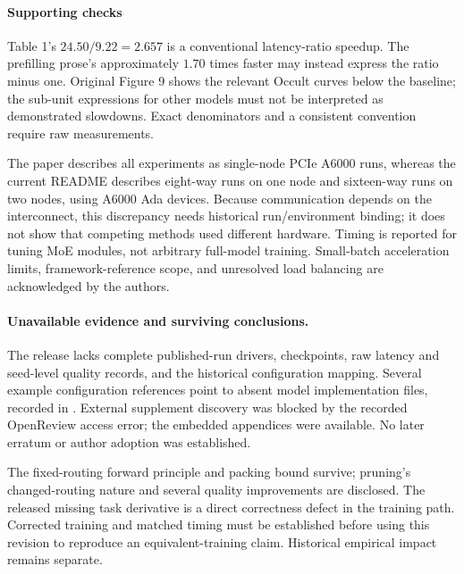 \documentclass[10pt]{article}
\begin{document}
\paragraph*{Supporting checks}\mbox{}\par
Table 1’s \(24.50/9.22=2.657\) is a conventional latency-ratio speedup. The prefilling prose’s approximately \(1.70\) times faster may instead express the ratio minus one. Original Figure 9 shows the relevant Occult curves below the baseline; the sub-unit expressions for other models must not be interpreted as demonstrated slowdowns. Exact denominators and a consistent convention require raw measurements.\par
The paper describes all experiments as single-node PCIe A6000 runs, whereas the current README describes eight-way runs on one node and sixteen-way runs on two nodes, using A6000 Ada devices. Because communication depends on the interconnect, this discrepancy needs historical run/environment binding; it does not show that competing methods used different hardware. Timing is reported for tuning MoE modules, not arbitrary full-model training. Small-batch acceleration limits, framework-reference scope, and unresolved load balancing are acknowledged by the authors.\par
\paragraph*{Unavailable evidence and surviving conclusions.}\mbox{}\par
The release lacks complete published-run drivers, checkpoints, raw latency and seed-level quality records, and the historical configuration mapping. Several example configuration references point to absent model implementation files, recorded in . External supplement discovery was blocked by the recorded OpenReview access error; the embedded appendices were available. No later erratum or author adoption was established.\par
The fixed-routing forward principle and packing bound survive; pruning’s changed-routing nature and several quality improvements are disclosed. The released missing task derivative is a direct correctness defect in the training path. Corrected training and matched timing must be established before using this revision to reproduce an equivalent-training claim. Historical empirical impact remains separate.\par
\end{document}
